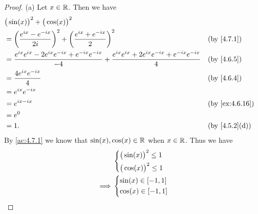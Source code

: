 \begin{proof}{(a)}
  Let \(x \in \mathbb{R}\).
  Then we have
  \begin{align*}
     & \big(\sin(x)\big)^2 + \big(\cos(x)\big)^2                                                                                                                                            \\
     & = \bigg(\dfrac{e^{i x} - e^{- i x}}{2i}\bigg)^2 + \bigg(\dfrac{e^{i x} + e^{- i x}}{2}\bigg)^2                                                     &  & \text{(by \cref{4.7.1})}     \\
     & = \dfrac{e^{i x} e^{i x} - 2 e^{i x} e^{- i x} + e^{- i x} e^{- i x}}{-4} + \dfrac{e^{i x} e^{i x} + 2 e^{i x} e^{- i x} + e^{- i x} e^{- i x}}{4} &  & \text{(by \cref{4.6.5})}     \\
     & = \dfrac{4 e^{i x} e^{- i x}}{4}                                                                                                                   &  & \text{(by \cref{4.6.4})}     \\
     & = e^{i x} e^{- i x}                                                                                                                                                                  \\
     & = e^{i x - i x}                                                                                                                                    &  & \text{(by \cref{ex:4.6.16})} \\
     & = e^0                                                                                                                                                                                \\
     & = 1.                                                                                                                                               &  & \text{(by \cref{4.5.2}(d))}
  \end{align*}
  By \cref{ac:4.7.1} we know that \(\sin(x), \cos(x) \in \mathbb{R}\) when \(x \in \mathbb{R}\).
  Thus we have
  \begin{align*}
             & \begin{dcases}
                 \big(\sin(x)\big)^2 \leq 1 \\
                 \big(\cos(x)\big)^2 \leq 1
               \end{dcases} \\
    \implies & \begin{dcases}
                 \sin(x) \in [-1, 1] \\
                 \cos(x) \in [-1, 1]
               \end{dcases}
  \end{align*}
\end{proof}

